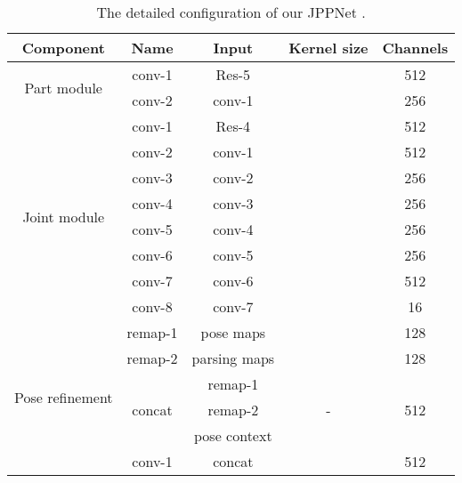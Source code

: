 \documentclass[10pt,journal,compsoc]{IEEEtran}
\begin{document}
\begin{table}[t]
\centering
\scriptsize
\tabcolsep 0.06in 
\caption{The detailed configuration of our JPPNet .}
\vspace{-3mm}
\label{tab: configuration}
\begin{tabular}{ccccc}
\toprule[0.8pt]
   Component                           & Name      & Input         & Kernel size      & Channels \\
\toprule[0.8pt]
   \multirow{2}{*}{Part module}        & conv-1    & Res-5         &        &  512     \\
                                       & conv-2    & conv-1        &        &  256     \\
\toprule[0.8pt]
   \multirow{8}{*}{Joint module}       & conv-1    & Res-4         &        &  512     \\
                                       & conv-2    & conv-1        &        &  512     \\
                                       & conv-3    & conv-2        &        &  256     \\
                                       & conv-4    & conv-3        &        &  256     \\
                                       & conv-5    & conv-4        &        &  256     \\
                                       & conv-6    & conv-5        &        &  256     \\
                                       & conv-7    & conv-6        &        &  512     \\
                                       & conv-8    & conv-7        &        &  16      \\
\toprule[0.8pt]
   \multirow{9}{*}{Pose refinement}    & remap-1   & pose maps     &        &  128     \\
                                       & remap-2   & parsing maps  &        &  128     \\
                                       & \multirow{3}{*}{concat}   & remap-1          & \multirow{3}{*}{-}  & \multirow{3}{*}{512}  \\
                                       &                           & remap-2          &                     &                       \\
                                       &                           & pose context     &                     &                       \\
                                       & conv-1    & concat        &        &  512     \\

\end{tabular}
\end{table}
\end{document}

